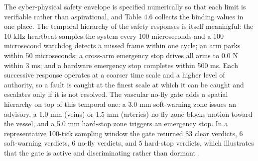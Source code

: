 The cyber-physical safety envelope is specified numerically so that each limit is
verifiable rather than aspirational, and Table 4.6 collects the binding values in one
place. The temporal hierarchy of the safety responses is itself meaningful: the
10 kHz heartbeat samples the system every 100 microseconds and a 100 microsecond
watchdog detects a missed frame within one cycle; an arm parks within 50
microseconds; a cross-arm emergency stop drives all arms to 0.0 N within 3 ms; and a
hardware emergency stop completes within 500 ms. Each successive response operates at
a coarser time scale and a higher level of authority, so a fault is caught at the
finest scale at which it can be caught and escalates only if it is not resolved.
The vascular no-fly gate adds a spatial hierarchy on top of this temporal one: a
3.0 mm soft-warning zone issues an advisory, a 1.0 mm (veins) or 1.5 mm (arteries)
no-fly zone blocks motion toward the vessel, and a 5.0 mm hard-stop zone triggers an
emergency stop. In a representative 100-tick sampling window the gate returned 83
clear verdicts, 6 soft-warning verdicts, 6 no-fly verdicts, and 5 hard-stop verdicts,
which illustrates that the gate is active and discriminating rather than dormant
\cite{onpremwhippl,daraxwhipple}.

